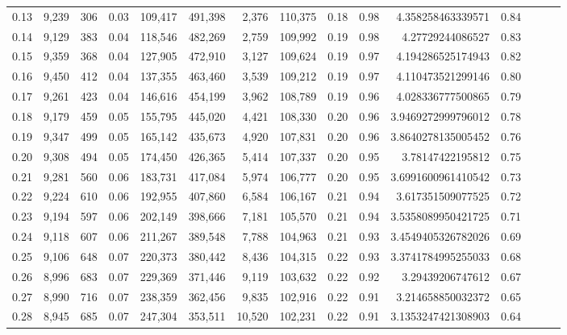 \begin{tabular}{rrrrrrrrrrrrrrr}
0.13 &  9,239 &    306 &  0.03 &  109,417 &  491,398 &    2,376 &  110,375 &  0.18 &  0.98 &     4.358258463339571 &      0.84 \\
0.14 &  9,129 &    383 &  0.04 &  118,546 &  482,269 &    2,759 &  109,992 &  0.19 &  0.98 &      4.27729244086527 &      0.83 \\
0.15 &  9,359 &    368 &  0.04 &  127,905 &  472,910 &    3,127 &  109,624 &  0.19 &  0.97 &     4.194286525174943 &      0.82 \\
0.16 &  9,450 &    412 &  0.04 &  137,355 &  463,460 &    3,539 &  109,212 &  0.19 &  0.97 &     4.110473521299146 &      0.80 \\
0.17 &  9,261 &    423 &  0.04 &  146,616 &  454,199 &    3,962 &  108,789 &  0.19 &  0.96 &     4.028336777500865 &      0.79 \\
0.18 &  9,179 &    459 &  0.05 &  155,795 &  445,020 &    4,421 &  108,330 &  0.20 &  0.96 &    3.9469272999796012 &      0.78 \\
0.19 &  9,347 &    499 &  0.05 &  165,142 &  435,673 &    4,920 &  107,831 &  0.20 &  0.96 &    3.8640278135005452 &      0.76 \\
0.20 &  9,308 &    494 &  0.05 &  174,450 &  426,365 &    5,414 &  107,337 &  0.20 &  0.95 &      3.78147422195812 &      0.75 \\
0.21 &  9,281 &    560 &  0.06 &  183,731 &  417,084 &    5,974 &  106,777 &  0.20 &  0.95 &    3.6991600961410542 &      0.73 \\
0.22 &  9,224 &    610 &  0.06 &  192,955 &  407,860 &    6,584 &  106,167 &  0.21 &  0.94 &     3.617351509077525 &      0.72 \\
0.23 &  9,194 &    597 &  0.06 &  202,149 &  398,666 &    7,181 &  105,570 &  0.21 &  0.94 &    3.5358089950421725 &      0.71 \\
0.24 &  9,118 &    607 &  0.06 &  211,267 &  389,548 &    7,788 &  104,963 &  0.21 &  0.93 &    3.4549405326782026 &      0.69 \\
0.25 &  9,106 &    648 &  0.07 &  220,373 &  380,442 &    8,436 &  104,315 &  0.22 &  0.93 &    3.3741784995255033 &      0.68 \\
0.26 &  8,996 &    683 &  0.07 &  229,369 &  371,446 &    9,119 &  103,632 &  0.22 &  0.92 &      3.29439206747612 &      0.67 \\
0.27 &  8,990 &    716 &  0.07 &  238,359 &  362,456 &    9,835 &  102,916 &  0.22 &  0.91 &     3.214658850032372 &      0.65 \\
0.28 &  8,945 &    685 &  0.07 &  247,304 &  353,511 &   10,520 &  102,231 &  0.22 &  0.91 &    3.1353247421308903 &      0.64 \\

\end{tabular}
